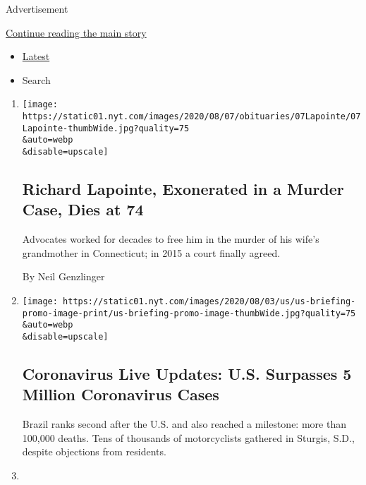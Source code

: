 Advertisement

\protect\hyperlink{after-mid1}{Continue reading the main story}

\begin{itemize}
\tightlist
\item
  \protect\hyperlink{stream-panel}{Latest}
\item
  Search
\end{itemize}

\begin{enumerate}
\def\labelenumi{\arabic{enumi}.}
\item
  \href{/2020/08/08/nyregion/richard-lapointe-dead.html}{}

  \texttt{[image: https://static01.nyt.com/images/2020/08/07/obituaries/07Lapointe/07Lapointe-thumbWide.jpg?quality=75\\\&auto=webp\\\&disable=upscale]}

  \hypertarget{richard-lapointe-exonerated-in-a-murder-case-dies-at-74}{%
  \subsection{Richard Lapointe, Exonerated in a Murder Case, Dies at
  74}\label{richard-lapointe-exonerated-in-a-murder-case-dies-at-74}}

  Advocates worked for decades to free him in the murder of his wife's
  grandmother in Connecticut; in 2015 a court finally agreed.

  By Neil Genzlinger
\item
  \href{/2020/08/08/world/coronavirus-updates.html}{}

  \texttt{[image: https://static01.nyt.com/images/2020/08/03/us/us-briefing-promo-image-print/us-briefing-promo-image-thumbWide.jpg?quality=75\\\&auto=webp\\\&disable=upscale]}

  \hypertarget{coronavirus-live-updates-us-surpasses-5-million-coronavirus-cases}{%
  \subsection{Coronavirus Live Updates: U.S. Surpasses 5 Million
  Coronavirus
  Cases}\label{coronavirus-live-updates-us-surpasses-5-million-coronavirus-cases}}

  Brazil ranks second after the U.S. and also reached a milestone: more
  than 100,000 deaths. Tens of thousands of motorcyclists gathered in
  Sturgis, S.D., despite objections from residents.
\item
  \href{/2020/08/07/health/coronavirus-ny-schools-reopen.html}{}


\end{enumerate}
